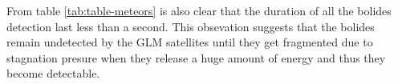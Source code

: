 From table \ref{tab:table-meteors} is also clear that the duration of all the bolides detection last less than a second. This obsevation suggests that the bolides remain undetected by the GLM satellites until they get fragmented due to stagnation presure when they release a huge amount of energy and thus they become detectable.






